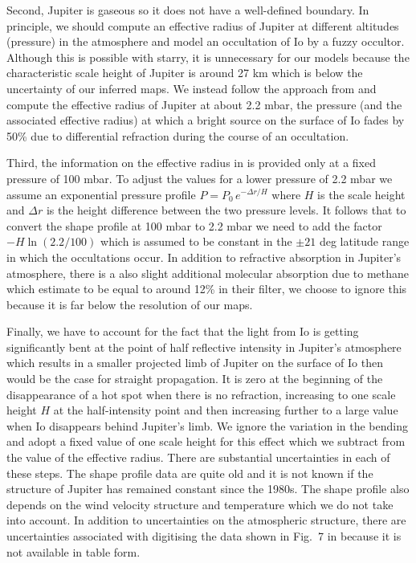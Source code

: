 \documentclass[12pt,dvipsnames]{report}
\begin{document}
Second, Jupiter is gaseous so it does not have a well-defined boundary.
In principle, we should compute an effective radius of Jupiter at different altitudes 
(pressure) in the atmosphere and model an occultation of Io by a fuzzy occultor.
Although this is possible with \textsf{starry}, it is unnecessary for our models because 
the characteristic scale height of Jupiter is around 27 km which is below the 
uncertainty of our inferred maps.
We instead follow the approach from \citet{1990Natur.348..618S} and compute the effective 
radius of Jupiter at about 2.2 mbar, the pressure (and the associated effective radius) 
at which a  bright source on the surface of Io fades by 50\% due to differential 
refraction during the course of an occultation.


Third, the information on the effective radius in \citet{1981JGR....86.8721L} is provided only at a fixed pressure of 100 mbar.
To adjust the values for a lower pressure of 2.2 mbar we assume an exponential pressure profile $P=P_0\, e^{-\Delta r/H}$ where $H$ is the scale height and $\Delta r$ is the height difference between the two pressure levels.
It follows that to convert the shape profile at 100 mbar to 2.2 mbar we need to add the factor
$-H\ln(2.2/100)$ which is assumed to be constant in the $\pm 21$ deg latitude range in which the occultations occur.
In addition to refractive absorption in Jupiter's atmosphere, there is a also slight 
additional molecular absorption due to methane which \citet{1990Natur.348..618S} estimate 
to be equal to around 12\% in their filter, we choose to ignore this because it is far 
below the resolution of our maps.

Finally, we have to account for the fact that the light from Io is getting significantly 
bent at the point of half reflective intensity in Jupiter's atmosphere which results in 
a smaller projected limb of Jupiter on the surface of Io then would be the case for 
straight propagation.
It is zero at the beginning of the disappearance of a hot spot when there is no refraction,
 increasing to one scale height $H$ at the half-intensity point and then increasing 
 further to a large value when Io disappears behind Jupiter's limb.
We ignore the variation in the bending and adopt a fixed value of one scale height for 
this effect which we subtract from the value of the effective radius.
There are substantial uncertainties in each of these steps.
The shape profile data are quite old and it is not known if the structure of Jupiter
 has remained constant since the 1980s. 
The shape profile also depends on the wind velocity structure and temperature which we 
do not take into account.
In addition to uncertainties on the atmospheric structure, there are uncertainties 
associated with digitising the data shown in Fig.~7 in \citet{1981JGR....86.8721L} 
because it is not available in table form.
\end{document}
